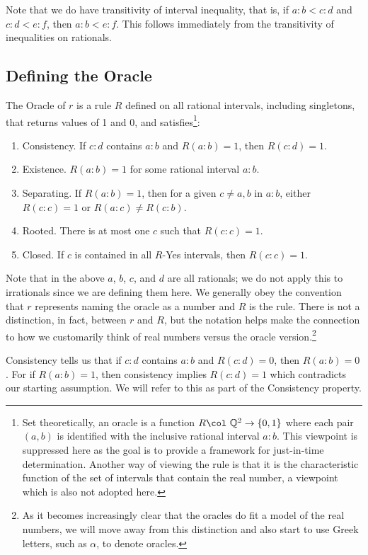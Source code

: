 \documentclass[12pt]{article}
\begin{document}
Note that we do have transitivity of interval inequality, that is, if $a:b < c:d$ and $c:d < e:f$, then $a:b < e:f$. This follows immediately from the transitivity of inequalities on rationals.


\subsection{Defining the Oracle}



The Oracle of $r$ is a rule $R$ defined on all rational intervals, including singletons, that returns values of 1 and 0, and satisfies\footnote{Set theoretically, an oracle is a function $R \col \ \mathbb{Q}^2 \to \{0,1\}$ where each pair $(a,b)$ is identified with the inclusive rational interval $a:b$. This viewpoint is suppressed here as the goal is to provide a framework for just-in-time determination. Another way of viewing the rule is that it is the characteristic function of the set of intervals that contain the real number, a viewpoint which is also not adopted here.}: 
\begin{enumerate}
    \item Consistency. If $c:d$ contains $a:b$ and $R(a:b) = 1$, then $R(c:d) = 1$.
    \item Existence. $R(a:b) = 1$ for some rational interval $a:b$.
    \item Separating. If $R(a:b)=1$, then for a given $c \neq a, b$ in $a:b$, either $R(c:c) = 1$ or $R(a:c) \neq R(c:b)$. 
    \item Rooted. There is at most one $c$ such that $R(c:c) =1$.
    \item Closed. If $c$ is contained in all $R$-Yes intervals, then $R(c:c) = 1$.
\end{enumerate}

Note that in the above $a$, $b$, $c$, and $d$ are all rationals; we do not apply this to irrationals since we are defining them here. We generally obey the convention that $r$ represents naming the oracle as a number and $R$ is the rule. There is not a distinction, in fact, between $r$ and $R$, but the notation helps make the connection to how we customarily think of real numbers versus the oracle version.\footnote{As it becomes increasingly clear that the oracles do fit a model of the real numbers, we will move away from this distinction and also start to use Greek letters, such as $\alpha$, to denote oracles.}

Consistency tells us that if $c:d$ contains $a:b$ and $R(c:d) = 0$, then $R(a:b) = 0$. For if $R(a:b)=1$, then consistency implies $R(c:d)=1$ which contradicts our starting assumption. We will refer to this as part of the Consistency property. 
\end{document}
